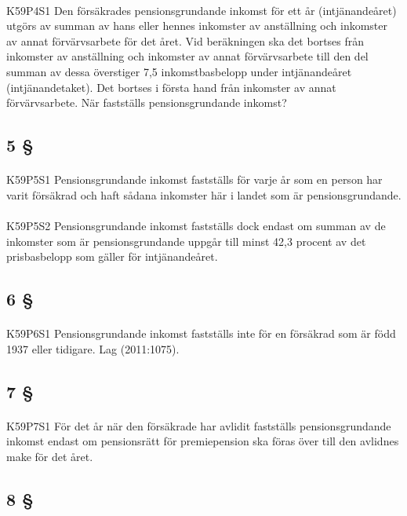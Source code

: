 \documentclass[a4paper,notitlepage,openany,10pt]{book}
\begin{document}
\paragraph*{}
{\tiny K59P4S1}
Den försäkrades pensionsgrundande inkomst för ett år (intjänandeåret) utgörs av summan av hans eller hennes inkomster av anställning och inkomster av annat förvärvsarbete för det året.
Vid beräkningen ska det bortses från inkomster av anställning och inkomster av annat förvärvsarbete till den del summan av dessa överstiger 7,5 inkomstbasbelopp under intjänandeåret (intjänandetaket). Det bortses i första hand från inkomster av annat förvärvsarbete.
När fastställs pensionsgrundande inkomst?
\subsection*{5 §}
\paragraph*{}
{\tiny K59P5S1}
Pensionsgrundande inkomst fastställs för varje år som en person har varit försäkrad och haft sådana inkomster här i landet som är pensionsgrundande.
\paragraph*{}
{\tiny K59P5S2}
Pensionsgrundande inkomst fastställs dock endast om summan av de inkomster som är pensionsgrundande uppgår till minst 42,3 procent av det prisbasbelopp som gäller för intjänandeåret.
\subsection*{6 §}
\paragraph*{}
{\tiny K59P6S1}
Pensionsgrundande inkomst fastställs inte för en försäkrad som är född 1937 eller tidigare.
Lag (2011:1075).
\subsection*{7 §}
\paragraph*{}
{\tiny K59P7S1}
För det år när den försäkrade har avlidit fastställs pensionsgrundande inkomst endast om pensionsrätt för premiepension ska föras över till den avlidnes make för det året.
\subsection*{8 §}
\end{document}
